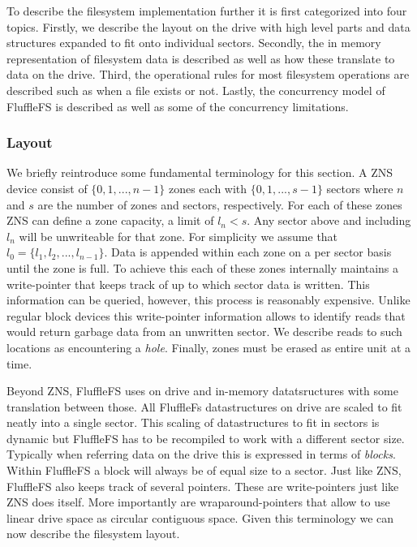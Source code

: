 To describe the filesystem implementation further it is first categorized into
four topics. Firstly, we describe the layout on the drive with high level parts
and data structures expanded to fit onto individual sectors. Secondly, the
in memory representation of filesystem data is described as well as how these
translate to data on the drive. Third, the operational rules for most filesystem
operations are described such as when a file exists or not. Lastly, the
concurrency model of FluffleFS is described as well as some of the concurrency
limitations.

\subsubsection{Layout}

We briefly reintroduce some fundamental terminology for this section. A ZNS
device consist of $\{0,1,...,n-1\}$ zones each with $\{0,1,...,s-1\}$ sectors
where $n$ and $s$ are the number of zones and sectors, respectively. For each of
these zones ZNS can define a zone capacity, a limit of $l_{n} < s$. Any sector
above and including $l_{n}$ will be unwriteable for that zone. For simplicity we
assume that $l_{0} = \{l_{1},l_{2},...,l_{n-1}\}$. Data is appended within each
zone on a per sector basis until the zone is full. To achieve this each of these
zones internally maintains a write-pointer that keeps track of up to which
sector data is written. This information can be queried, however, this process
is reasonably expensive. Unlike regular block devices this write-pointer
information allows to identify reads that would return garbage data from an
unwritten sector. We describe reads to such locations as encountering a
\textit{hole}. Finally, zones must be erased as entire unit at a time.

Beyond ZNS, FluffleFS uses on drive and in-memory datatsructures with some
translation between those. All FluffleFs datastructures on drive are scaled to
fit neatly into a single sector. This scaling of datastructures to fit in
sectors is dynamic but FluffleFS has to be recompiled to work with a different
sector size. Typically when referring data on the drive this is expressed in
terms of \textit{blocks}. Within FluffleFS a block will always be of equal size
to a sector. Just like ZNS, FluffleFS also keeps track of several pointers.
These are write-pointers just like ZNS does itself. More importantly are
wraparound-pointers that allow to use linear drive space as circular contiguous
space. Given this terminology we can now describe the filesystem layout.

